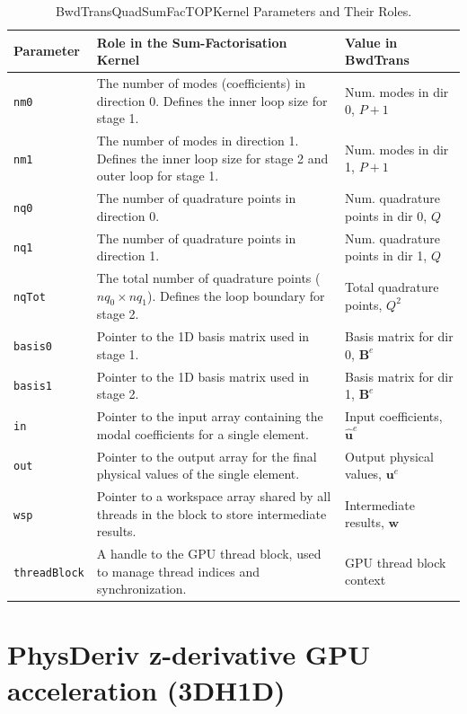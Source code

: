 \begin{table}[h!]
\centering
\caption{BwdTransQuadSumFacTOPKernel Parameters and Their Roles.}
\label{tab:sumfactopkernel_params}
\begin{tabularx}{\textwidth}{l p{6.5cm} X}
\toprule
\textbf{Parameter} & \textbf{Role in the Sum-Factorisation Kernel} & \textbf{Value in BwdTrans} \\
\midrule
\texttt{nm0}       & The number of modes (coefficients) in direction 0. Defines the inner loop size for stage 1. & Num. modes in dir 0, $P+1$ \\
\texttt{nm1}       & The number of modes in direction 1. Defines the inner loop size for stage 2 and outer loop for stage 1. & Num. modes in dir 1, $P+1$ \\
\texttt{nq0}       & The number of quadrature points in direction 0. & Num. quadrature points in dir 0, $Q$ \\
\texttt{nq1}       & The number of quadrature points in direction 1. & Num. quadrature points in dir 1, $Q$ \\
\texttt{nqTot}     & The total number of quadrature points ($nq_0 \times nq_1$). Defines the loop boundary for stage 2. & Total quadrature points, $Q^2$ \\
\texttt{basis0}    & Pointer to the 1D basis matrix used in stage 1. & Basis matrix for dir 0, $\mathbf{B}^e$ \\
\texttt{basis1}    & Pointer to the 1D basis matrix used in stage 2. & Basis matrix for dir 1, $\mathbf{B}^e$ \\
\texttt{in}        & Pointer to the input array containing the modal coefficients for a single element. & Input coefficients, $\mathbf{\hat{u}}^e$ \\
\texttt{out}       & Pointer to the output array for the final physical values of the single element. & Output physical values, $\mathbf{u}^e$ \\
\texttt{wsp}       & Pointer to a workspace array shared by all threads in the block to store intermediate results. & Intermediate results, $\mathbf{w}$ \\
\texttt{threadBlock} & A handle to the GPU thread block, used to manage thread indices and synchronization. & GPU thread block context \\
\bottomrule
\end{tabularx}
\end{table}

\section{PhysDeriv z-derivative GPU acceleration (3DH1D)}

